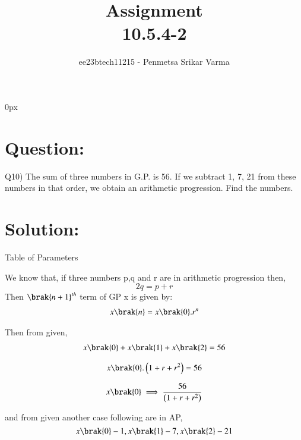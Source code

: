 \documentclass[beamer]{IEEEtran}
\theoremstyle{remark}
\begin{document}
\parindent 0px


\title{Assignment\\[1ex]10.5.4-2}
\author{ee23btech11215 - Penmetsa Srikar Varma$^{}$%
}
\maketitle
\newpage
\bigskip

\renewcommand{\thefigure}{\theenumi}
\renewcommand{\thetable}{\theenumi}
\section*{Question:}
Q10) The sum of three numbers in G.P. is 56. If we subtract 1, 7, 21 from these numbers in that order, we obtain an arithmetic progression. Find the numbers.
\section*{Solution:}
{\centering
Table of Parameters\\
}
\begin{table}[h]
    \centering
    
     \label{tab:t1}
\end{table}
We know that, if three numbers p,q and r are in arithmetic progression then,
\begin{equation}
\label{q1}
2q = p + r
\end{equation}
Then $\brak{n+1}^{th}$ term of GP x is given by:\\

\begin{align}
\label{e1}
x\brak{n}=x\brak{0}.r^{n}
\end{align}

Then from given,
\begin{align}
x\brak{0}+x\brak{1}+x\brak{2}=56
\end{align}

\begin{align}
x\brak{0}.\left(1+r+r^2\right)=56
\end{align}

\begin{equation}
\label{q2}
x\brak{0}\implies\frac{56}{\left(1+r+r^2\right)}
\end{equation}

and from given another case following are in AP,
$$
x\brak{0}-1,x\brak{1}-7,x\brak{2}-21
$$
\end{document}
